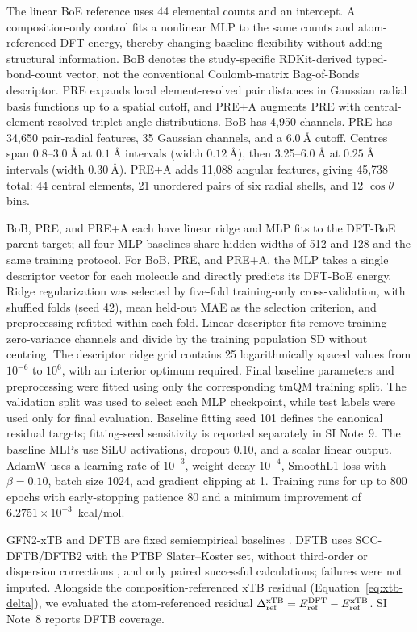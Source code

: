 The linear BoE reference uses 44 elemental counts and an intercept. A composition-only control fits a nonlinear MLP to the same counts and atom-referenced DFT energy, thereby changing baseline flexibility without adding structural information. BoB denotes the study-specific RDKit-derived typed-bond-count vector, not the conventional Coulomb-matrix Bag-of-Bonds descriptor. PRE expands local element-resolved pair distances in Gaussian radial basis functions up to a spatial cutoff, and PRE+A augments PRE with central-element-resolved triplet angle distributions. BoB has 4,950 channels. PRE has 34,650 pair-radial features, 35 Gaussian channels, and a \(6.0~\text{\AA}\) cutoff. Centres span 0.8--\(3.0~\text{\AA}\) at \(0.1~\text{\AA}\) intervals (width \(0.12~\text{\AA}\)), then 3.25--\(6.0~\text{\AA}\) at \(0.25~\text{\AA}\) intervals (width \(0.30~\text{\AA}\)). PRE+A adds 11,088 angular features, giving 45,738 total: 44 central elements, 21 unordered pairs of six radial shells, and 12 \(\cos\theta\) bins.

BoB, PRE, and PRE+A each have linear ridge and MLP fits to the DFT-BoE parent target; all four MLP baselines share hidden widths of 512 and 128 and the same training protocol. For BoB, PRE, and PRE+A, the MLP takes a single descriptor vector for each molecule and directly predicts its DFT-BoE energy. Ridge regularization was selected by five-fold training-only cross-validation, with shuffled folds (seed 42), mean held-out MAE as the selection criterion, and preprocessing refitted within each fold. Linear descriptor fits remove training-zero-variance channels and divide by the training population SD without centring. The descriptor ridge grid contains 25 logarithmically spaced values from \(10^{-6}\) to \(10^6\), with an interior optimum required. Final baseline parameters and preprocessing were fitted using only the corresponding tmQM training split. The validation split was used to select each MLP checkpoint, while test labels were used only for final evaluation. Baseline fitting seed 101 defines the canonical residual targets; fitting-seed sensitivity is reported separately in SI Note~9. The baseline MLPs use SiLU activations, dropout 0.10, and a scalar linear output. AdamW uses a learning rate of \(10^{-3}\), weight decay \(10^{-4}\), SmoothL1 loss with \(\beta=0.10\), batch size 1024, and gradient clipping at 1. Training runs for up to 800 epochs with early-stopping patience 80 and a minimum improvement of \(6.2751\times10^{-3}\)~kcal/mol.

GFN2-xTB and DFTB are fixed semiempirical baselines \cite{bannwarth2019gfn2xtb,elstner1998sccdftb,hourahine2020dftbplus}. DFTB uses SCC-DFTB/DFTB2 with the PTBP Slater--Koster set, without third-order or dispersion corrections \cite{dftborg2025ptbp}, and only paired successful calculations; failures were not imputed. Alongside the composition-referenced xTB residual (Equation~\ref{eq:xtb-delta}), we evaluated the atom-referenced residual \(\Delta_{\rm ref}^{\rm xTB}=E_{\rm ref}^{\rm DFT}-E_{\rm ref}^{\rm xTB}\). SI Note~8 reports DFTB coverage.

